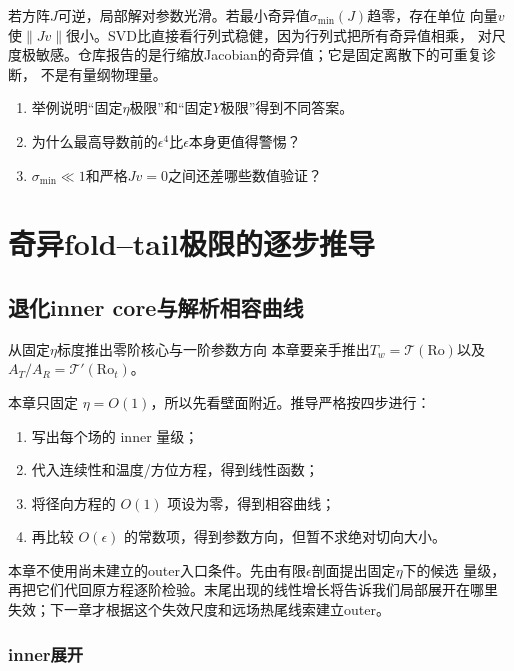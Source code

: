 \documentclass[UTF8,zihao=-4,openany]{ctexbook}
\newcommand{\eps}{\epsilon}
\newcommand{\Ro}{\mathrm{Ro}}
\newcommand{\Tcurve}{\mathcal T}
\begin{document}
若方阵$J$可逆，局部解对参数光滑。若最小奇异值$\sigma_{\min}(J)$趋零，存在单位
向量$v$使$\|Jv\|$很小。SVD比直接看行列式稳健，因为行列式把所有奇异值相乘，
对尺度极敏感。仓库报告的是行缩放Jacobian的奇异值；它是固定离散下的可重复诊断，
不是有量纲物理量。

\begin{checkpoint}
\begin{enumerate}
  \item 举例说明“固定$\eta$极限”和“固定$Y$极限”得到不同答案。
  \item 为什么最高导数前的$\eps^4$比$\eps$本身更值得警惕？
  \item $\sigma_{\min}\ll1$和严格$Jv=0$之间还差哪些数值验证？
\end{enumerate}
\end{checkpoint}

\part{奇异fold--tail极限的逐步推导}

\chapter{退化inner core与解析相容曲线}\label{ch:inner}

\begin{learninggoal}{从固定$\eta$标度推出零阶核心与一阶参数方向}
本章要亲手推出$T_w=\Tcurve(\Ro)$以及$A_T/A_R=\Tcurve'(\Ro_t)$。
\end{learninggoal}

本章只固定 $\eta=O(1)$，所以先看壁面附近。推导严格按四步进行：
\begin{enumerate}
  \item 写出每个场的 inner 量级；
  \item 代入连续性和温度/方位方程，得到线性函数；
  \item 将径向方程的 $O(1)$ 项设为零，得到相容曲线；
  \item 再比较 $O(\eps)$ 的常数项，得到参数方向，但暂不求绝对切向大小。
\end{enumerate}
本章不使用尚未建立的outer入口条件。先由有限$\eps$剖面提出固定$\eta$下的候选
量级，再把它们代回原方程逐阶检验。末尾出现的线性增长将告诉我们局部展开在哪里
失效；下一章才根据这个失效尺度和远场热尾线索建立outer。

\section{inner展开}
\end{document}
